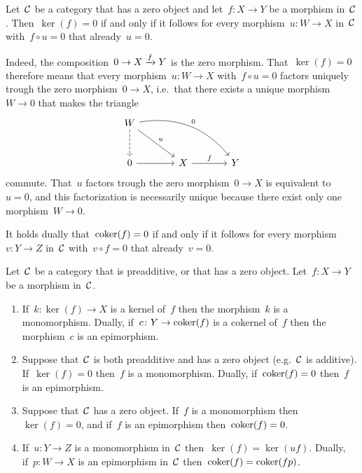 \begin{remark*}
  Let~$\mathcal{C}$ be a category that has a zero object and let~$f \colon X \to Y$ be a morphism in~$\mathcal{C}$.
  Then~$\ker(f) = 0$ if and only if it follows for every morphism~$u \colon W \to X$ in~$\mathcal{C}$ with~$f \circ u = 0$ that already~$u = 0$.
  
  Indeed, the composition~$0 \to X \xrightarrow{f} Y$ is the zero morphism.
  That~$\ker(f) = 0$ therefore means that every morphism~$u \colon W \to X$ with~$f \circ u = 0$ factors uniquely trough the zero morphism~$0 \to X$, i.e.\ that there exists a unique morphism~$W \to 0$ that makes the triangle
  \[
    \begin{tikzcd}[sep = large]
        W
        \arrow[dashed]{d}
        \arrow{dr}[above right]{u}
        \arrow[bend left]{drr}[above right]{0}
      & {}
      & {}
      \\
        0
        \arrow{r}
      & X
        \arrow{r}[above]{f}
      & Y
    \end{tikzcd}
  \]
  commute.
  That~$u$ factors trough the zero morphism~$0 \to X$ is equivalent to~$u = 0$, and this factorization is necessarily unique because there exist only one morphism~$W \to 0$.
  
  It holds dually that~$\operatorname{coker}(f) = 0$ if and only if it follows for every morphism~$v \colon Y \to Z$ in~$\mathcal{C}$ with~$v \circ f = 0$ that already~$v = 0$.
\end{remark*}


\begin{lemma}
  Let~$\mathcal{C}$ be a category that is preadditive, or that has a zero object.
  Let~$f \colon X \to Y$ be a morphism in~$\mathcal{C}$.
  \begin{enumerate}
    \item
      If~$k \colon \ker(f) \to X$ is a kernel of~$f$ then the morphism~$k$ is a monomorphism.
      Dually, if~$c \colon Y \to \operatorname{coker}(f)$ is a cokernel of~$f$ then the morphism~$c$ is an epimorphism.
    \item
      Suppose that~$\mathcal{C}$ is both preadditive and has a zero object (e.g.~$\mathcal{C}$ is additive).
      If~$\ker(f) = 0$ then~$f$ is a monomorphism.
      Dually, if~$\operatorname{coker}(f) = 0$ then~$f$ is an epimorphism.
    \item
      Suppose that~$\mathcal{C}$ has a zero object.
      If~$f$ is a monomorphism then~$\ker(f) = 0$, and if~$f$ is an epimorphism then~$\operatorname{coker}(f) = 0$.
    \item
      If~$u \colon Y \to Z$ is a monomorphism in~$\mathcal{C}$ then~$\ker(f) = \ker(uf)$.
      Dually, if~$p \colon W \to X$ is an epimorphism in~$\mathcal{C}$ then~$\operatorname{coker}(f) = \operatorname{coker}(fp)$.
  \end{enumerate}
\end{lemma}


